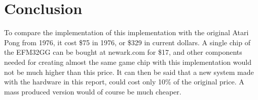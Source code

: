 \section{Conclusion}


To compare the implementation of this implementation with the original Atari
Pong from 1976, it cost \$75 in 1976\cite{pongreview}, or \$329 in current
dollars. A single chip of the EFM32GG can be bought at newark.com for \$17, and
other components needed for creating almost the same game chip with this
implementation would not be much higher than this price. It can then be said
that a new system made with the hardware in this report, could cost only 10\%
of the original price. A mass produced version would of course be much cheaper.
